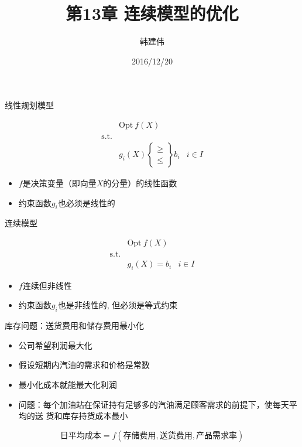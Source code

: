 \documentclass[mathserif, table]{beamer}
\title{第13章 连续模型的优化}
\author{韩建伟}
\institute{
  信息学院\\
  \texttt{mm@hanjianwei.com}
}
\date{2016/12/20}
\begin{document}
\begin{frame}[plain]
  \titlepage{}
\end{frame}

\begin{frame}{线性规划模型}
  \begin{block}{}
    \[ 
    \begin{array}{lcl}
      & \mbox{Opt}\ f(X) & \\
      \mbox{s.t.} & &  \\
      &
      g_i(X) \left\{
        \begin{array}{c}
          \ge\\
          \le
        \end{array}
      \right\} b_i& i \in I
    \end{array}
    \]
  \end{block}

  \begin{itemize}
  \item $f$是决策变量（即向量$X$的分量）的线性函数
  \item 约束函数$g_i$也必须是线性的
  \end{itemize}
  
\end{frame}

\begin{frame}{连续模型}
  \begin{block}{}
    \[ 
    \begin{array}{lcl}
      & \mbox{Opt}\ f(X) & \\
      \mbox{s.t.} & &  \\
      &
      g_i(X) = b_i& i \in I
    \end{array}
    \]
  \end{block}

  \begin{itemize}
  \item $f$连续但非线性
  \item 约束函数$g_i$也是非线性的, 但必须是等式约束
  \end{itemize}
  
\end{frame}

\begin{frame}{库存问题：送货费用和储存费用最小化}

  \begin{itemize}
  \item<1-> 公司希望利润最大化
  \item<2-> 假设短期内汽油的需求和价格是常数
  \item<3-> 最小化成本就能最大化利润
  \item<4-> 问题：每个加油站在保证持有足够多的汽油满足顾客需求的前提下，使每天平均的送
    货和库存持货成本最小 
  \end{itemize}

   {
    \[
      \text{日平均成本} = f(\text{存储费用}, \text{送货费用}, \text{产品需求率})
    \]
  }
  
\end{frame}
\end{document}
